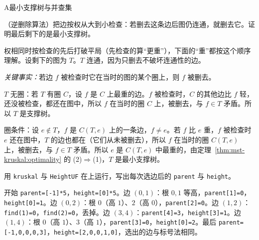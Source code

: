 \begin{exercises}{A}{最小支撑树与并查集}
\item\label{ex:mst-kruskal:A4} （逆删除算法）把边按权从大到小检查：若删去这条边后图仍连通，就删去它。证明最后剩下的是最小支撑树。
\begin{solution}
权相同时按检查的先后打破平局（先检查的算“更重”），下面的“重”都按这个顺序理解。设剩下的图为 $T$。$T$ 连通，因为只删去不破坏连通性的边。

\emph{关键事实：}若边 $f$ 被检查时它在当时的图的某个圈上，则 $f$ 被删去。

$T$ 无圈：若 $T$ 有圈 $C$，设 $f$ 是 $C$ 上最重的边。$f$ 被检查时，$C$ 的其他边比 $f$ 轻，还没被检查，都还在图中，所以 $f$ 在当时的圈 $C$ 上，被删去，与 $f\in T$ 矛盾。所以 $T$ 是支撑树。

圈条件：设 $e\notin T$，$f$ 是 $C(T,e)$ 上的一条边，$f\neq e$。若 $f$ 比 $e$ 重，$f$ 被检查时 $e$ 还在图中，$T$ 的边也都在（它们从未被删去），所以 $f$ 在当时的圈 $C(T,e)$ 上，被删去，与 $f\in T$ 矛盾。所以 $e$ 是 $C(T,e)$ 中最重的，由定理~\ref{thm:mst-kruskal:optimality} 的 (2)$\Rightarrow$(1)，$T$ 是最小支撑树。
\end{solution}

\item\label{ex:mst-kruskal:A5} 用 \texttt{kruskal} 与 \texttt{HeightUF} 在上运行，写出每次选边后的 \texttt{parent} 与 \texttt{height}。
\begin{solution}
开始 \texttt{parent=[-1]*5}，\texttt{height=[0]*5}。边 $(0,1)$：根 $0,1$ 等高，\texttt{parent[1]=0}，\texttt{height[0]=1}。边 $(0,2)$：根 $0$（高 $1$）、$2$（高 $0$），\texttt{parent[2]=0}。边 $(1,2)$：\texttt{find(1)=0}，\texttt{find(2)=0}，丢掉。边 $(3,4)$：\texttt{parent[4]=3}，\texttt{height[3]=1}。边 $(1,4)$：根 $0$（高 $1$）、$3$（高 $1$），\texttt{parent[3]=0}，\texttt{height[0]=2}。最后 \texttt{parent=[-1,0,0,0,3]}，\texttt{height=[2,0,0,1,0]}，选出的边与标号法相同。
\end{solution}
\end{exercises}
